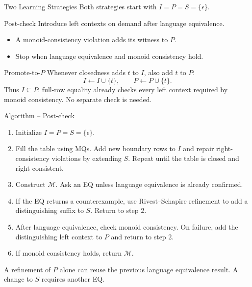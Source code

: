 \documentclass{beamer}
\begin{document}
\begin{frame}{Two Learning Strategies}
    Both strategies start with $I=P=S=\{\epsilon\}$.
    \begin{block}{Post-check}
        Introduce left contexts on demand after language equivalence.
        \begin{itemize}
            \item A monoid-consistency violation adds its witness to $P$.
            \item Stop when language equivalence and monoid consistency hold.
        \end{itemize}
    \end{block}
    \begin{block}{Promote-to-$P$}
        Whenever closedness adds $t$ to $I$, also add $t$ to $P$:
        $$
        I\leftarrow I\cup\{t\},\qquad P\leftarrow P\cup\{t\}.
        $$
        Thus $I\subseteq P$: full-row equality already checks every left
        context required by monoid consistency. No separate check is needed.
    \end{block}
\end{frame}

\begin{frame}{Algorithm -- Post-check}
    \begin{enumerate}
        \item Initialize $I=P=S=\{\epsilon\}$.
        \item Fill the table using MQs. Add new boundary rows to $I$ and
        repair right-consistency violations by extending $S$.
        Repeat until the table is closed and right consistent.
        \item Construct $\mathcal{M}$. Ask an EQ unless language equivalence
        is already confirmed.
        \item If the EQ returns a counterexample, use Rivest--Schapire
        refinement to add a distinguishing suffix to $S$. Return to step 2.
        \item After language equivalence, check monoid consistency.
        On failure, add the distinguishing left context to $P$
        and return to step 2.
        \item If monoid consistency holds, return $\mathcal{M}$.
    \end{enumerate}
    \vspace{0.3em}
    {\small A refinement of $P$ alone can reuse the previous language
    equivalence result. A change to $S$ requires another EQ.}
\end{frame}
\end{document}
